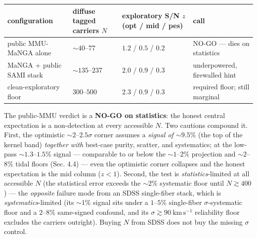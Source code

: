 \documentclass[
]{article}
\newcounter{none} %
\begin{document}
{\def\LTcaptype{none} %
\begin{longtable}[]{@{}
  >{\raggedright\arraybackslash}p{}
  >{\raggedright\arraybackslash}p{}
  >{\raggedright\arraybackslash}p{}
  >{\raggedright\arraybackslash}p{}@{}}
\toprule\noalign{}
\begin{minipage}[b]{\linewidth}\raggedright
configuration
\end{minipage} & \begin{minipage}[b]{\linewidth}\raggedright
diffuse tagged carriers \(N\)
\end{minipage} & \begin{minipage}[b]{\linewidth}\raggedright
exploratory S/N \(z\) (opt / mid / pes)
\end{minipage} & \begin{minipage}[b]{\linewidth}\raggedright
call
\end{minipage} \\
\midrule\noalign{}
\endhead
\bottomrule\noalign{}
\endlastfoot
public MMU-MaNGA alone & \(\sim40\)--\(77\) & \(1.2\) / \(0.5\) /
\(0.2\) & NO-GO --- dies on statistics \\
MaNGA + public SAMI stack & \(\sim135\)--\(237\) & \(2.0\) / \(0.9\) /
\(0.3\) & underpowered, firewalled hint \\
clean-exploratory floor & \(300\)--\(500\) & \(2.3\) / \(0.9\) / \(0.3\)
& required floor; still marginal \\
\end{longtable}
}

The public-MMU verdict is a \textbf{NO-GO on statistics}: the honest
central expectation is a non-detection at every accessible \(N\). Two
cautions compound it. First, the optimistic \(\sim2\)--\(2.5\sigma\)
corner assumes a \emph{signal of \(\sim9.5\%\)} (the top of the kernel
band) \emph{together with} best-case purity, scatter, and systematics;
at the low-pass \(\sim1.3\)--\(1.5\%\) signal --- comparable to or below
the \(\sim1\)--\(2\%\) projection and \(\sim2\)--\(8\%\) tidal floors
(Sec. 4.4) --- even the optimistic corner collapses and the honest
expectation is the mid column (\(z<1\)). Second, the test is
\emph{statistics}-limited at all accessible \(N\) (the statistical error
exceeds the \(\sim2\%\) systematic floor until \(N\gtrsim400\)) --- the
\emph{opposite} failure mode from an SDSS single-fiber stack, which is
\emph{systematics}-limited (its \(\sim1\%\) signal sits under a
\(1\)--\(5\%\) single-fiber \(\sigma\)-systematic floor and a
\(2\)--\(8\%\) same-signed confound, and its
\(\sigma\gtrsim90\ \mathrm{km\,s^{-1}}\) reliability floor excludes the
carriers outright). Buying \(N\) from SDSS does not buy the missing
\(\sigma\) control.
\end{document}
